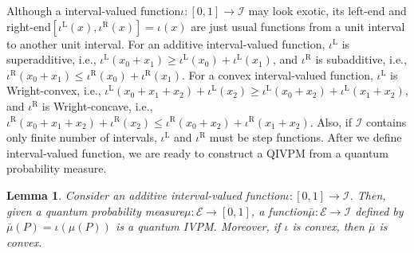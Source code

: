 \documentclass[12pt]{iopart}
\theoremstyle{plain}
\newtheorem{lemma}[thm]{Lemma}
\theoremstyle{definition}
\theoremstyle{remark}
\newcommand{\events}{\ensuremath{\mathcal{E}}}
\newcommand{\nb}{\nolinebreak[3] }
\newcommand{\iotal}[1][]{\ensuremath{\iota^{\mathrm{L{#1}}}}}
\newcommand{\iotar}[1][]{\ensuremath{\iota^{\mathrm{R{#1}}}}}
\begin{document}
Although a interval-valued function\nb$\iota:\left[0,1\right]\rightarrow\mathscr{I}$
may look exotic, its left-end and right-end\nb$\left[\iotal\left(x\right),\iotar\left(x\right)\right]=\iota\left(x\right)$
are just usual functions from a unit interval to another unit interval.
For an additive interval-valued function, $\iotal$ is superadditive,
i.e., $\iotal\left(x_{0}+x_{1}\right)\ge\iotal\left(x_{0}\right)+\iotal\left(x_{1}\right)$,
and $\iotar$ is subadditive, i.e., $\iotar\left(x_{0}+x_{1}\right)\le\iotar\left(x_{0}\right)+\iotar\left(x_{1}\right)$\nb\cite{PecaricTong1992}.
For a convex interval-valued function, $\iotal$ is Wright-convex,
i.e., $\iotal\left(x_{0}+x_{1}+x_{2}\right)+\iotal\left(x_{2}\right)\ge\iotal\left(x_{0}+x_{2}\right)+\iotal\left(x_{1}+x_{2}\right)$,
and $\iotar$ is Wright-concave, i.e., $\iotar\left(x_{0}+x_{1}+x_{2}\right)+\iotar\left(x_{2}\right)\le\iotar\left(x_{0}+x_{2}\right)+\iotar\left(x_{1}+x_{2}\right)$\nb\cite{Wright1954,RobertsVarberg1973,PecaricTong1992,Brzdek_2014}.
Also, if $\mathscr{I}$ contains only finite number of intervals,
$\iotal$ and $\iotar$ must be step functions. After we define interval-valued
function, we are ready to construct a QIVPM from a quantum probability
measure.

\begin{lemma}\label{lemma:real2interval}Consider an additive interval-valued
function\nb$\iota:\left[0,1\right]\rightarrow\mathscr{I}$. Then,
given a quantum probability measure\nb$\mu:\events\rightarrow\left[0,1\right]$,
a function\nb$\bar{\mu}:\events\rightarrow\mathscr{I}$ defined by
$\bar{\mu}\left(P\right)=\iota\left(\mu\left(P\right)\right)$ is
a quantum IVPM. Moreover, if $\iota$ is convex, then $\bar{\mu}$
is convex.\end{lemma}
\end{document}
